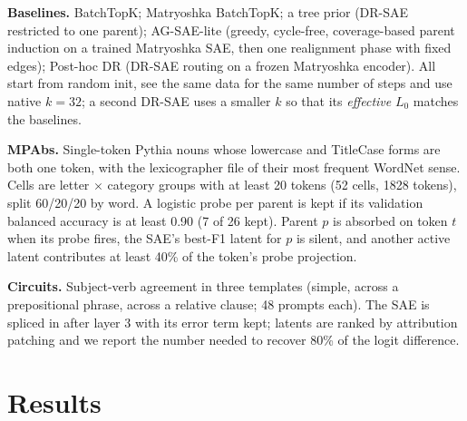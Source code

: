 \documentclass[10pt]{article}
\begin{document}
\textbf{Baselines.} BatchTopK; Matryoshka BatchTopK; a tree prior (DR-SAE restricted to one parent); AG-SAE-lite (greedy, cycle-free, coverage-based parent induction on a trained Matryoshka SAE, then one realignment phase with fixed edges); Post-hoc DR (DR-SAE routing on a frozen Matryoshka encoder). All start from random init, see the same data for the same number of steps and use native $k = 32$; a second DR-SAE uses a smaller $k$ so that its \emph{effective} $L_0$ matches the baselines.

\textbf{MPAbs.} Single-token Pythia nouns whose lowercase and TitleCase forms are both one token, with the lexicographer file of their most frequent WordNet sense. Cells are letter $\times$ category groups with at least 20 tokens (52 cells, 1828 tokens), split 60/20/20 by word. A logistic probe per parent is kept if its validation balanced accuracy is at least 0.90 (7 of 26 kept). Parent $p$ is absorbed on token $t$ when its probe fires, the SAE's best-F1 latent for $p$ is silent, and another active latent contributes at least 40\% of the token's probe projection.

\textbf{Circuits.} Subject-verb agreement in three templates (simple, across a prepositional phrase, across a relative clause; 48 prompts each). The SAE is spliced in after layer 3 with its error term kept; latents are ranked by attribution patching and we report the number needed to recover 80\% of the logit difference.

\section{Results}
\end{document}
